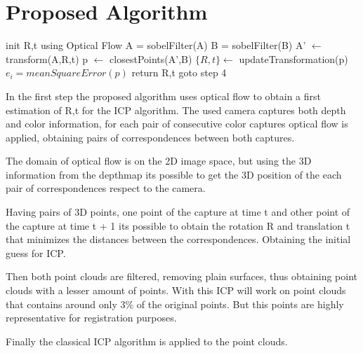 \section{Proposed Algorithm}
\begin{algorithmic}[1]
\State init R,t using Optical Flow
\State A = sobelFilter(A)
\State B = sobelFilter(B)
\State A' $\leftarrow$ transform(A,R,t) 
\State p $\leftarrow$ closestPoints(A',B)
\State $\{R,t\} \gets$ updateTransformation(p)
\State $e_i = meanSquareError(p)$
	\State return R,t
\Else
	\State goto step 4
\EndIf
\end{algorithmic}


In the first step the proposed algorithm uses optical flow to obtain a first estimation of 
R,t for the ICP algorithm. The used camera captures both depth and color 
information, for each pair of consecutive color captures optical flow 
is applied, obtaining pairs of correspondences between both captures. 

The domain of optical flow is on the 2D image space, but using 
the 3D information from the depthmap its possible to get the 3D position 
of the each pair of correspondences respect to the camera. 

Having pairs of 3D points, one point of the capture at time t and other point 
of the capture at time t + 1 its possible to obtain the rotation R and translation t
 that minimizes the distances between the correspondences. Obtaining the initial guess 
 for ICP.


Then both point clouds are filtered, removing plain surfaces, thus obtaining point clouds 
with a lesser amount of points. With this ICP will work on point clouds that contains around 
only 3\% of the original points. But this points are highly representative for registration purposes.

Finally the classical ICP algorithm is applied to the point clouds.

 






